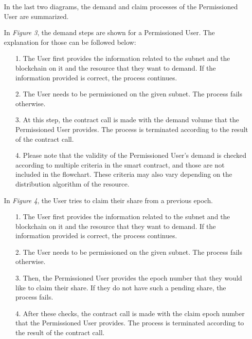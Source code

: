 \documentclass[a4paper,12pt]{report}
\begin{document}
In the last two diagrams, the demand and claim processes of the Permissioned User are summarized.

In \textit{Figure 3}, the demand steps are shown for a Permissioned User. The explanation for those can be followed below:
\begin{itemize}
	\item [1.]
	The User first provides the information related to the subnet and the blockchain on it and the resource that they want to demand. If the information provided is correct, the process continues.
	\\
	\item [2.]
	The User needs to be permissioned on the given subnet. The process fails otherwise.
	\\
	\item [3.]
	At this step, the contract call is made with the demand volume that the Permissioned User provides. The process is terminated according to the result of the contract call.
	\\
	\item [4.]
	Please note that the validity of the Permissioned User’s demand is checked according to multiple criteria in the smart contract, and those are not included in the flowchart. These criteria may also vary depending on the distribution algorithm of the resource.
\end{itemize}

In \textit{Figure 4}, the User tries to claim their share from a previous epoch.
\begin{itemize}
	\item [1.]
	The User first provides the information related to the subnet and the blockchain on it and the resource that they want to demand. If the information provided is correct, the process continues.
	\\
	\item [2.]
	The User needs to be permissioned on the given subnet. The process fails otherwise.
	\\
	\item [3.]
	Then, the Permissioned User provides the epoch number that they would like to claim their share. If they do not have such a pending share, the process fails.
	\\
	\item [4.]
	After these checks, the contract call is made with the claim epoch number that the Permissioned User provides. The process is terminated according to the result of the contract call.
\end{itemize}
\end{document}

